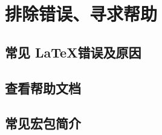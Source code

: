 \chapter{排除错误、寻求帮助}\label{chap:error-helps}

\leavevmode\nobreakspace

\section{常见 \LaTeX 错误及原因}\label{sec:errors}

\leavevmode\nobreakspace

\section{查看帮助文档}\label{sec:texdoc}

\leavevmode\nobreakspace

\section{常见宏包简介}\label{sec:pkg-list}

\leavevmode\nobreakspace

\endinput